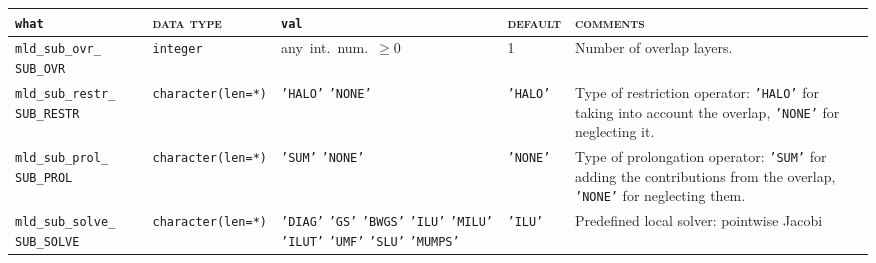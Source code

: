 \bsideways
\begin{center}
\small
\begin{tabular}{|p{3.5cm}|l|p{3.2cm}|l|p{5cm}|}
\hline
\verb|what|              & \textsc{data type}        &  \verb|val|      &  \textsc{default}  &
\textsc{comments} \\ \hline
\verb|mld_sub_ovr_|  \break \verb|SUB_OVR|      & \verb|integer|
                         & any~int.~num.~$\ge 0$
                         & 1
                         & Number of overlap layers. \\ \hline
\verb|mld_sub_restr_|  \break \verb|SUB_RESTR|   & \verb|character(len=*)|
                         & \texttt{'HALO'} \hspace{2.5cm} \texttt{'NONE'}
                         & \texttt{'HALO'}
                         & Type of restriction operator:
                           \texttt{'HALO'} for taking into account the overlap, \texttt{'NONE'} 
                           for neglecting it. \\ \hline
\verb|mld_sub_prol_| \break \verb|SUB_PROL|   & \verb|character(len=*)|
                         & \texttt{'SUM'} \hspace{2.5cm} \texttt{'NONE'}
                         & \texttt{'NONE'}
                         & Type of prolongation operator:
                           \texttt{'SUM'} for adding the contributions from the overlap, \texttt{'NONE'}
                           for neglecting them.   \\ \hline
\verb|mld_sub_solve_| \break \verb|SUB_SOLVE|    & \verb|character(len=*)|
                         & \texttt{'DIAG'} \hspace{2.5cm}
                           \texttt{'GS'} \hspace{2.5cm} \texttt{'BWGS'} \hspace{2.5cm}
                           \texttt{'ILU'} \hspace{2.5cm} 
                           \texttt{'MILU'} \hspace{2.5cm} \texttt{'ILUT'} 
                           \hspace{2.5cm}
                           \texttt{'UMF'} \hspace{2.5cm}
                           \texttt{'SLU'}
                           \hspace{2.5cm} \texttt{'MUMPS'}
                         & \texttt{'ILU'}
                         & Predefined local solver: pointwise Jacobi

\end{tabular}
\end{center}
